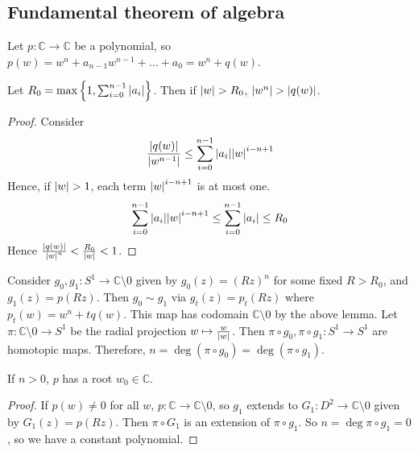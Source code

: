 \subsection{Fundamental theorem of algebra}
Let \( p \colon \mathbb C \to \mathbb C \) be a polynomial, so \( p(w) = w^n + a_{n-1} w^{n-1} + \dots + a_0 = w^n + q(w) \).
\begin{lemma}
	Let \( R_0 = \max \qty{1, \sum_{i=0}^{n-1} \abs{a_i}} \).
	Then if \( \abs{w} > R_0 \), \( \abs{w^n} > \abs{q(w)} \).
\end{lemma}
\begin{proof}
	Consider
	\[ \frac{\abs{q(w)}}{\abs{w^{n-1}}} \leq \sum_{i=0}^{n-1} \abs{a_i} \abs{w}^{i-n+1} \]
	Hence, if \( \abs{w} > 1 \), each term \( \abs{w}^{i-n+1} \) is at most one.
	\[ \sum_{i=0}^{n-1} \abs{a_i} \abs{w}^{i-n+1} \leq \sum_{i=0}^{n-1} \abs{a_i} \leq R_0 \]
	Hence \( \frac{\abs{q(w)}}{\abs{w}^n} < \frac{R_0}{\abs{w}} < 1 \).
\end{proof}
Consider \( g_0, g_1 \colon S^1 \to \mathbb C \setminus \qty{0} \) given by \( g_0(z) = (Rz)^n \) for some fixed \( R > R_0 \), and \( g_1(z) = p(Rz) \).
Then \( g_0 \sim g_1 \) via \( g_t(z) = p_t(Rz) \) where \( p_t(w) = w^n + tq(w) \).
This map has codomain \( \mathbb C \setminus \qty{0} \) by the above lemma.
Let \( \pi \colon \mathbb C \setminus \qty{0} \to S^1 \) be the radial projection \( w \mapsto \frac{w}{\abs{w}} \).
Then \( \pi \circ g_0, \pi \circ g_1 \colon S^1 \to S^1 \) are homotopic maps.
Therefore, \( n = \deg (\pi \circ g_0) = \deg (\pi \circ g_1) \).
\begin{theorem}
	If \( n > 0 \), \( p \) has a root \( w_0 \in \mathbb C \).
\end{theorem}
\begin{proof}
	If \( p(w) \neq 0 \) for all \( w \), \( p \colon \mathbb C \to \mathbb C \setminus \qty{0} \), so \( g_1 \) extends to \( G_1 \colon D^2 \to \mathbb C \setminus \qty{0} \) given by \( G_1(z) = p(Rz) \).
	Then \( \pi \circ G_1 \) is an extension of \( \pi \circ g_1 \).
	So \( n = \deg \pi \circ g_1 = 0 \), so we have a constant polynomial.
\end{proof}

